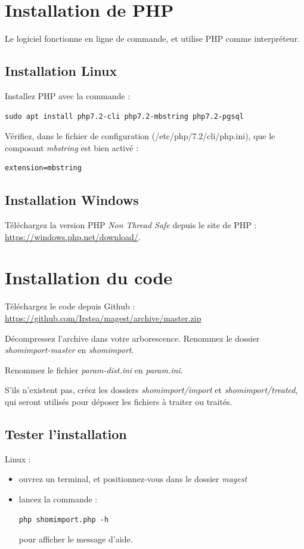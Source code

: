 \documentclass[12pt,a4paper]{article}
\begin{document}
\section{Installation de PHP}
Le logiciel fonctionne en ligne de commande, et utilise PHP comme interpréteur.

\subsection{Installation Linux}
Installez PHP avec la commande :
\begin{lstlisting}
sudo apt install php7.2-cli php7.2-mbstring php7.2-pgsql
\end{lstlisting}

Vérifiez, dans le fichier de configuration (/etc/php/7.2/cli/php.ini), que le composant \textit{mbstring} est bien activé :
\begin{lstlisting}
extension=mbstring
\end{lstlisting}


\subsection{Installation Windows}
Téléchargez la version PHP \textit{Non Thread Safe} depuis le site de PHP : \href{https://windows.php.net/download/}{https://windows.php.net/download/}.

\section{Installation du code}
Téléchargez le code depuis Github : \href{https://github.com/Irstea/magest/archive/master.zip}{https://github.com/Irstea/magest/archive/master.zip}

Décompressez l'archive dans votre arborescence. Renommez le dossier \textit{shomimport-master} en \textit{shomimport}.

Renommez le fichier \textit{param-dist.ini} en \textit{param.ini}.

S'ils n'existent pas, créez les dossiers \textit{shomimport/import} et \textit{shomimport/treated}, qui seront utilisés pour déposer les fichiers à traiter ou traités.

\subsection{Tester l'installation}

Linux :
\begin{itemize}
\item ouvrez un terminal, et positionnez-vous dans le dossier \textit{magest}
\item lancez la commande :
\begin{lstlisting}
php shomimport.php -h
\end{lstlisting}
pour afficher le message d'aide.
\end{itemize}
\end{document}
